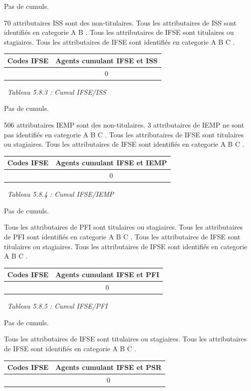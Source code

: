 Pas de cumuls.

70 attributaires ISS sont des non-titulaires. Tous les attributaires de
ISS sont identifiés en categorie A B . Tous les attributaires de IFSE
sont titulaires ou stagiaires. Tous les attributaires de IFSE sont
identifiés en categorie A B C .

\begin{longtable}[]{@{}cc@{}}
\toprule
Codes IFSE & Agents cumulant IFSE et ISS\tabularnewline
\midrule
\endhead
& 0\tabularnewline
\bottomrule
\end{longtable}

~\emph{Tableau 5.8.3 : Cumul IFSE/ISS}

Pas de cumuls.

506 attributaires IEMP sont des non-titulaires. 3 attributaires de IEMP
ne sont pas identifiés en categorie A B C . Tous les attributaires de
IFSE sont titulaires ou stagiaires. Tous les attributaires de IFSE sont
identifiés en categorie A B C .

\begin{longtable}[]{@{}cc@{}}
\toprule
Codes IFSE & Agents cumulant IFSE et IEMP\tabularnewline
\midrule
\endhead
& 0\tabularnewline
\bottomrule
\end{longtable}

~\emph{Tableau 5.8.4 : Cumul IFSE/IEMP}

Pas de cumuls.

Tous les attributaires de PFI sont titulaires ou stagiaires. Tous les
attributaires de PFI sont identifiés en categorie A B C . Tous les
attributaires de IFSE sont titulaires ou stagiaires. Tous les
attributaires de IFSE sont identifiés en categorie A B C .

\begin{longtable}[]{@{}cc@{}}
\toprule
Codes IFSE & Agents cumulant IFSE et PFI\tabularnewline
\midrule
\endhead
& 0\tabularnewline
\bottomrule
\end{longtable}

~\emph{Tableau 5.8.5 : Cumul IFSE/PFI}

Pas de cumuls.

Tous les attributaires de IFSE sont titulaires ou stagiaires. Tous les
attributaires de IFSE sont identifiés en categorie A B C .

\begin{longtable}[]{@{}cc@{}}
\toprule
Codes IFSE & Agents cumulant IFSE et PSR\tabularnewline
\midrule
\endhead
& 0\tabularnewline
\bottomrule
\end{longtable}

